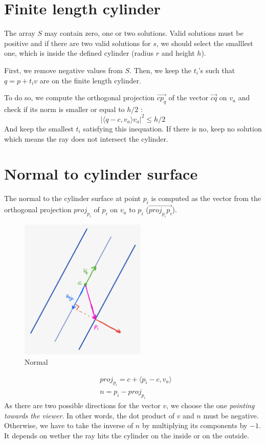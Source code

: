 \documentclass{article}
\begin{document}
\section{Finite length cylinder}
The array $S$ may contain zero, one or two solutions. Valid solutions must be positive and if there are two valid solutions for $s$, we should select the smalllest one, which is inside the defined cylinder (radius $r$ and height $h$).

First, we remove negative values from $S$. Then, we keep the $t_i$'s such that $q = p+t_iv$ are on the finite length cylinder.

To do so, we compute the orthogonal projection $\overrightarrow{cp_q}$ of the vector $\overrightarrow{cq}$ on $v_a$ and check if its norm is smaller or equal to $h/2$ :
$$|\langle q-c, v_a\rangle v_a|^2 \leq h/2$$
And keep the smallest $t_i$ satisfying this inequation. If there is no, keep no solution which means the ray does not intersect the cylinder.

\section{Normal to cylinder surface}

The normal to the cylinder surface at point $p_i$ is computed as the vector from the orthogonal projection $proj_{p_i}$ of $p_i$ on $v_a$ to $p_i$ ($\overrightarrow{proj_{p_i}p_i}$).

\begin{figure}[h]
\centering
\includegraphics[width=6cm]{res/Normal_sketch.jpeg}
\caption{Normal}
\end{figure}


\begin{align*}
    &proj_{p_i} = c + \langle p_i-c, v_a \rangle \\
    &n = p_i - proj_{p_i}
\end{align*}
As there are two possible directions for the vector $v$, we choose the one \textit{pointing towards the viewer}. In other words, the dot product of $v$ and $n$ must be negative. Otherwise, we have to take the inverse of $n$ by multiplying its components by $-1$. It depends on wether the ray hits the cylinder on the inside or on the outside.
\end{document}
